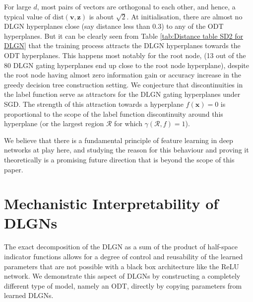 \documentclass{article} %
\renewcommand{\>}{{\rightarrow}}
\renewcommand{\=}{\stackrel{\triangle}{=}}
\newcommand{\0}{{\mathbf 0}}
\newcommand{\cR}{{\mathcal R}}
\renewcommand{\v}{{\mathbf v}}
\newcommand{\x}{{\mathbf x}}
\newcommand{\z}{{\mathbf z}}
\begin{document}
For large $d$, most pairs of vectors are orthogonal to each other, and hence, a typical value of $\text{dist}(\v,\z)$ is about $\sqrt{2}$. At initialisation, there are almost no DLGN hyperplanes close (say distance less than $0.3$) to any of the ODT hyperplanes. But it can be clearly seen from Table \ref{tab:Distance table SD2 for DLGN} that the training process attracts the DLGN hyperplanes towards the ODT hyperplanes. This happens most notably for the root node, (13 out of the 80 DLGN gating hyperplanes end up close to the root node hyperplane),  despite the root node having almost zero information gain or accuracy increase in the greedy decision tree construction setting. We conjecture that discontinuities in the label function serve as attractors for the DLGN gating hyperplanes under SGD. The strength of this attraction towards a hyperplane $f(\x)=0$ is proportional to the scope of the label function discontinuity around this hyperplane (or the largest region $\cR$ for which $\gamma(\cR,f)=1$).

We believe that there is a fundamental principle of feature learning in deep networks at play here, and studying the reason for this behaviour and proving it theoretically is a promising future direction that is beyond the scope of this paper. 

\section{Mechanistic Interpretability of DLGNs}
\label{sec:dlgndt}

The exact decomposition of the DLGN as a sum of the product of half-space indicator functions allows for a degree of control and reusability of the learned parameters that are not possible with a black box architecture like the ReLU network. We demonstrate this aspect of DLGNs by constructing a completely different type of model, namely an ODT, directly by copying parameters from learned DLGNs. 
\end{document}
